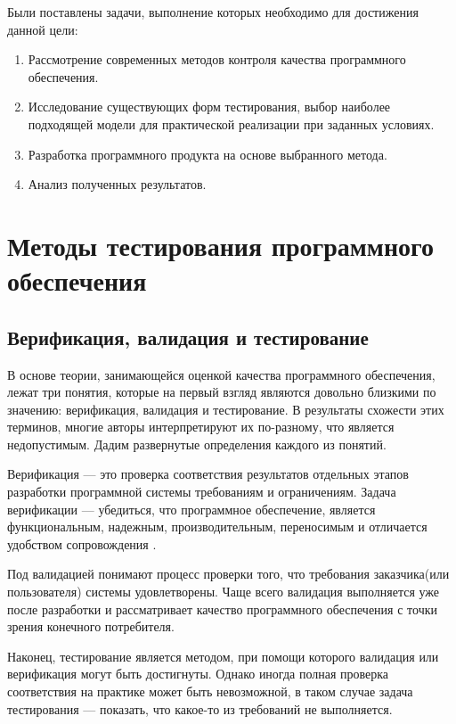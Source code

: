 \documentclass[a4paper,14pt,href]{article}
\begin{document}
  Были поставлены задачи, выполнение которых необходимо для достижения данной цели:
\begin{enumerate}
\item Рассмотрение современных методов контроля качества программного обеспечения.
\item Исследование существующих форм тестирования, выбор наиболее подходящей модели для практической реализации при заданных условиях.
\item Разработка программного продукта на основе выбранного метода.
\item Анализ полученных результатов.
\end{enumerate}

\section{Методы тестирования программного обеспечения}
\subsection{Верификация, валидация и тестирование}
 В основе теории, занимающейся оценкой качества программного обеспечения, лежат три понятия, которые на первый взгляд являются довольно близкими по значению: верификация, валидация и тестирование. В результаты схожести этих терминов, многие авторы интерпретируют их по-разному\cite{IntelVerification}, что является недопустимым. Дадим развернутые определения каждого из понятий.

 Верификация --- это проверка соответствия результатов отдельных этапов разработки программной системы требованиям и ограничениям. Задача верификации --- убедиться, что программное обеспечение, является функциональным, надежным, производительным, переносимым и отличается удобством сопровождения\cite{Kulyamin} \cite{ISO9126}.

 Под валидацией понимают процесс проверки того, что требования заказчика(или пользователя) системы удовлетворены. Чаще всего валидация выполняется уже после разработки и рассматривает качество программного обеспечения с точки зрения конечного потребителя.

 Наконец, тестирование является методом, при помощи которого валидация или верификация могут быть достигнуты. Однако иногда полная проверка соответствия на практике может быть невозможной, в таком случае задача тестирования --- показать, что какое-то из требований не выполняется\cite{Ahin}.
\end{document}
